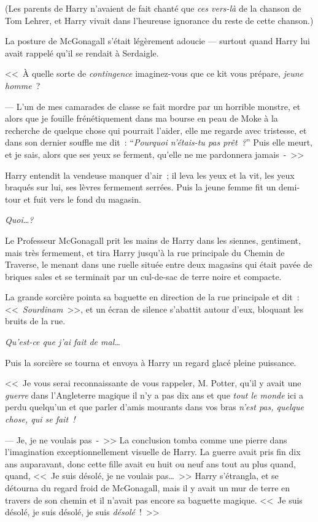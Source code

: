 (Les parents de Harry n'avaient de fait chanté que \emph{ces vers-là} de la chanson de Tom Lehrer, et Harry vivait dans l'heureuse ignorance du reste de cette chanson.)

La posture de McGonagall s'était légèrement adoucie — surtout quand Harry lui avait rappelé qu'il se rendait à Serdaigle.

<<~À quelle sorte de \emph{contingence} imaginez-vous que ce kit vous prépare, \emph{jeune homme}~?

--- L'un de mes camarades de classe se fait mordre par un horrible monstre, et alors que je fouille frénétiquement dans ma bourse en peau de Moke à la recherche de quelque chose qui pourrait l'aider, elle me regarde avec tristesse, et dans son dernier souffle me dit~: “\emph{Pourquoi n'étais-tu pas prêt~?}” Puis elle meurt, et je sais, alors que ses yeux se ferment, qu'elle ne me pardonnera jamais~-~>>

Harry entendit la vendeuse manquer d'air~; il leva les yeux et la vit, les yeux braqués sur lui, ses lèvres fermement serrées. Puis la jeune femme fit un demi-tour et fuit vers le fond du magasin.

\emph{Quoi…?}

Le Professeur McGonagall prit les mains de Harry dans les siennes, gentiment, mais très fermement, et tira Harry jusqu'à la rue principale du Chemin de Traverse, le menant dans une ruelle située entre deux magasins qui était pavée de briques sales et se terminait par un cul-de-sac de terre noire et compacte.

La grande sorcière pointa sa baguette en direction de la rue principale et dit~: <<~\emph{Sourdinam}~>>, et un écran de silence s'abattit autour d'eux, bloquant les bruits de la rue.

\emph{Qu'est-ce que j'ai fait de mal…}

Puis la sorcière se tourna et envoya à Harry un regard glacé pleine puissance.

<<~Je vous serai reconnaissante de vous rappeler, M. Potter, qu'il y avait une \emph{guerre} dans l'Angleterre magique il n'y a pas dix ans et que \emph{tout le monde} ici a perdu quelqu'un et que parler d'amis mourants dans vos bras \emph{n'est pas, quelque chose, qui se fait~!}

--- Je, je ne voulais pas~-~>> La conclusion tomba comme une pierre dans l'imagination exceptionnellement visuelle de Harry. La guerre avait pris fin dix ans auparavant, donc cette fille avait eu huit ou neuf ans tout au plus quand, quand, <<~Je suis désolé, je ne voulais pas…~>> Harry s'étrangla, et se détourna du regard froid de McGonagall, mais il y avait un mur de terre en travers de son chemin et il n'avait pas encore sa baguette magique. <<~Je suis désolé, je suis désolé, je suis \emph{désolé}~!~>>

